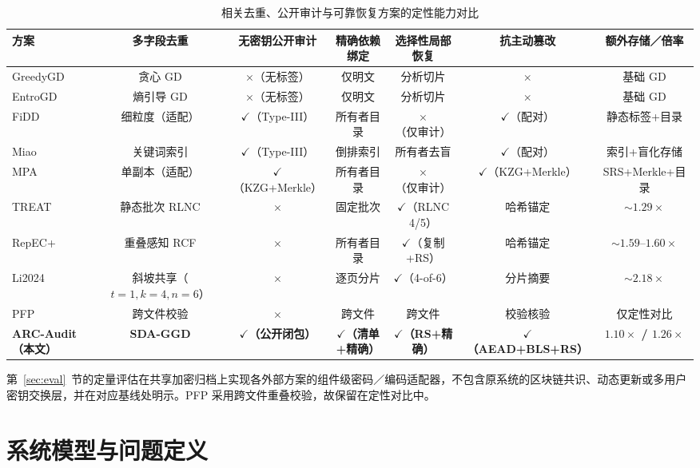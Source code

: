 \documentclass[10pt,journal]{IEEEtran}
\newcommand{\tabnote}[1]{\par\smallskip\parbox{\linewidth}{\footnotesize #1}}
\begin{document}
\begin{table}[t]\centering\scriptsize
\caption{相关去重、公开审计与可靠恢复方案的定性能力对比}\label{tab:lit-compare}
\setlength{\tabcolsep}{4pt}
\begin{tabular}{@{}lcccccc@{}}\toprule
方案 & 多字段去重 & 无密钥公开审计 & 精确依赖绑定 & 选择性局部恢复 & 抗主动篡改 & 额外存储／倍率\\\midrule
GreedyGD~\cite{Hurst2024GreedyGD} & 贪心 GD & $\times$（无标签） & 仅明文 & 分析切片 & $\times$ & 基础 GD\\
EntroGD~\cite{Zhao2026EntroGD} & 熵引导 GD & $\times$（无标签） & 仅明文 & 分析切片 & $\times$ & 基础 GD\\
FiDD~\cite{Huang2026FiDD} & 细粒度（适配） & $\checkmark$（Type-III） & 所有者目录 & $\times$（仅审计） & $\checkmark$（配对） & 静态标签+目录\\
Miao~\cite{Miao2025} & 关键词索引 & $\checkmark$（Type-III） & 倒排索引 & 所有者去盲 & $\checkmark$（配对） & 索引+盲化存储\\
MPA~\cite{Xu2026MPA} & 单副本（适配） & $\checkmark$（KZG+Merkle） & 所有者目录 & $\times$（仅审计） & $\checkmark$（KZG+Merkle） & SRS+Merkle+目录\\
TREAT~\cite{Taurone2024TREAT} & 静态批次 RLNC & $\times$ & 固定批次 & $\checkmark$（RLNC 4/5） & 哈希锚定 & $\sim 1.29\times$\\
RepEC+~\cite{Zuo2022RepECPlus} & 重叠感知 RCF & $\times$ & 所有者目录 & $\checkmark$（复制+RS） & 哈希锚定 & $\sim 1.59$--$1.60\times$\\
Li2024~\cite{Li2024TNSE} & 斜坡共享（$t{=}1,k{=}4,n{=}6$） & $\times$ & 逐页分片 & $\checkmark$（4-of-6） & 分片摘要 & $\sim 2.18\times$\\
PFP~\cite{Wu2019PFP} & 跨文件校验 & $\times$ & 跨文件 & 跨文件 & 校验核验 & 仅定性对比\\
\textbf{ARC-Audit（本文）} & \textbf{SDA-GGD} & \textbf{$\checkmark$（公开闭包）} & \textbf{$\checkmark$（清单+精确）} & \textbf{$\checkmark$（RS+精确）} & \textbf{$\checkmark$（AEAD+BLS+RS）} & \textbf{$1.10\times$ / $1.26\times$}\\\bottomrule
\end{tabular}
\tabnote{第~\ref{sec:eval}~节的定量评估在共享加密归档上实现各外部方案的组件级密码／编码适配器，不包含原系统的区块链共识、动态更新或多用户密钥交换层，并在对应基线处明示。PFP 采用跨文件重叠校验，故保留在定性对比中。}
\end{table}

\section{系统模型与问题定义}\label{sec:model}
\end{document}
